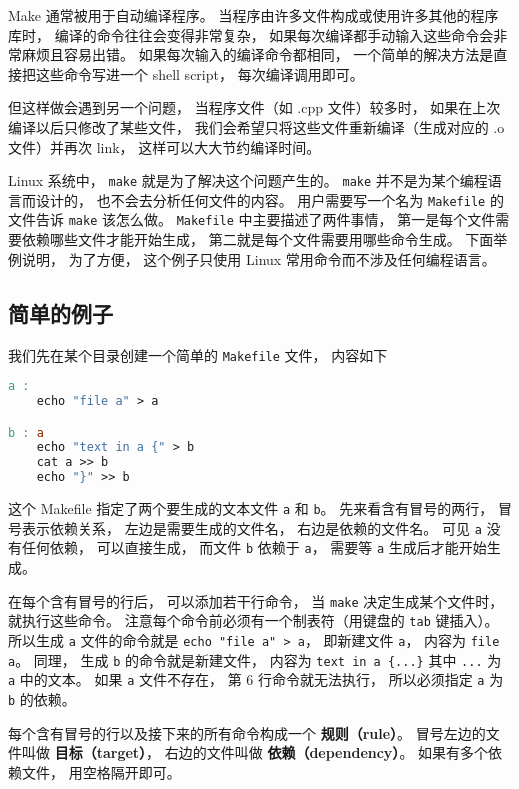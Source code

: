 
Make 通常被用于自动编译程序。 当程序由许多文件构成或使用许多其他的程序库时， 编译的命令往往会变得非常复杂， 如果每次编译都手动输入这些命令会非常麻烦且容易出错。 如果每次输入的编译命令都相同， 一个简单的解决方法是直接把这些命令写进一个 shell script， 每次编译调用即可。

但这样做会遇到另一个问题， 当程序文件（如 .cpp 文件）较多时， 如果在上次编译以后只修改了某些文件， 我们会希望只将这些文件重新编译（生成对应的 .o 文件）并再次 link， 这样可以大大节约编译时间。

Linux 系统中， \verb|make| 就是为了解决这个问题产生的。 \verb|make| 并不是为某个编程语言而设计的， 也不会去分析任何文件的内容。 用户需要写一个名为 \verb|Makefile| 的文件告诉 \verb|make| 该怎么做。 \verb|Makefile| 中主要描述了两件事情， 第一是每个文件需要依赖哪些文件才能开始生成， 第二就是每个文件需要用哪些命令生成。 下面举例说明， 为了方便， 这个例子只使用 Linux 常用命令而不涉及任何编程语言。


\subsection{简单的例子}
我们先在某个目录创建一个简单的 \verb|Makefile| 文件， 内容如下
\begin{lstlisting}[language=makefile, caption=Makefile]
a :
	echo "file a" > a

b : a
	echo "text in a {" > b
	cat a >> b
	echo "}" >> b
\end{lstlisting}
这个 Makefile 指定了两个要生成的文本文件 \verb|a| 和 \verb|b|。 先来看含有冒号的两行， 冒号表示依赖关系， 左边是需要生成的文件名， 右边是依赖的文件名。 可见 \verb|a| 没有任何依赖， 可以直接生成， 而文件 \verb|b| 依赖于 \verb|a|， 需要等 \verb|a| 生成后才能开始生成。

在每个含有冒号的行后， 可以添加若干行命令， 当 \verb|make| 决定生成某个文件时， 就执行这些命令。 注意每个命令前必须有一个制表符（用键盘的 \verb|tab| 键插入）。 所以生成 \verb|a| 文件的命令就是 \verb|echo "file a" > a|， 即新建文件 \verb|a|， 内容为 \verb|file a|。 同理， 生成 \verb|b| 的命令就是新建文件， 内容为 \verb|text in a {...}| 其中 \verb|...| 为 \verb|a| 中的文本。 如果 \verb|a| 文件不存在， 第 6 行命令就无法执行， 所以必须指定 \verb|a| 为 \verb|b| 的依赖。

每个含有冒号的行以及接下来的所有命令构成一个 \textbf{规则（rule）}。 冒号左边的文件叫做 \textbf{目标（target）}， 右边的文件叫做 \textbf{依赖（dependency）}。 如果有多个依赖文件， 用空格隔开即可。

